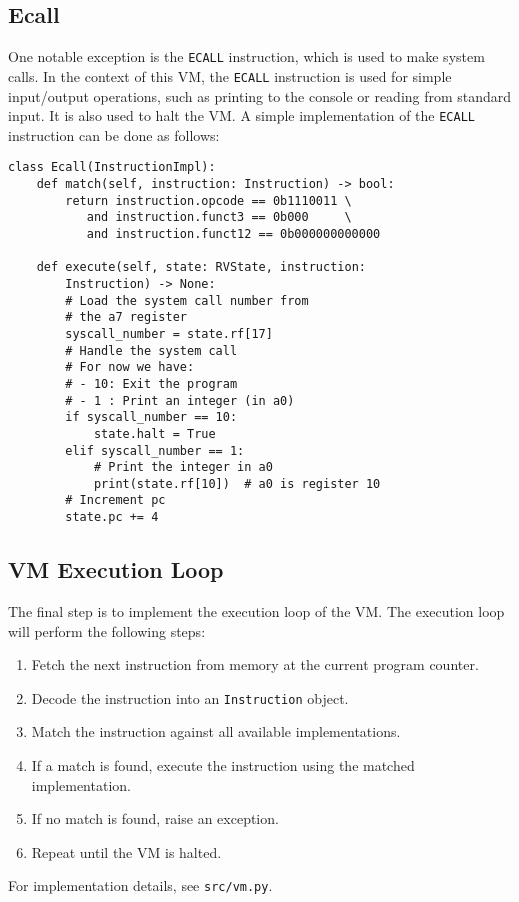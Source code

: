 \documentclass[sigconf]{acmart}
\begin{document}
\subsection{Ecall}
One notable exception is the \texttt{ECALL} instruction, which is used to make system calls. In the context of this VM, the \texttt{ECALL} instruction is used for simple input/output operations, such as printing to the console or reading from standard input. It is also used to halt the VM.
A simple implementation of the \texttt{ECALL} instruction can be done as follows:
\begin{verbatim}
class Ecall(InstructionImpl):
    def match(self, instruction: Instruction) -> bool:
        return instruction.opcode == 0b1110011 \
           and instruction.funct3 == 0b000     \
           and instruction.funct12 == 0b000000000000
    
    def execute(self, state: RVState, instruction: 
        Instruction) -> None:
        # Load the system call number from 
        # the a7 register
        syscall_number = state.rf[17]
        # Handle the system call
        # For now we have:
        # - 10: Exit the program
        # - 1 : Print an integer (in a0)
        if syscall_number == 10:
            state.halt = True
        elif syscall_number == 1:
            # Print the integer in a0
            print(state.rf[10])  # a0 is register 10
        # Increment pc
        state.pc += 4
\end{verbatim}

\subsection{VM Execution Loop}
The final step is to implement the execution loop of the VM.
The execution loop will perform the following steps:
\begin{enumerate}
    \item Fetch the next instruction from memory at the current program counter.
    \item Decode the instruction into an \texttt{Instruction} object.
    \item Match the instruction against all available implementations.
    \item If a match is found, execute the instruction using the matched implementation.
    \item If no match is found, raise an exception.
    \item Repeat until the VM is halted.
\end{enumerate}
For implementation details, see \texttt{src/vm.py}.
\end{document}
